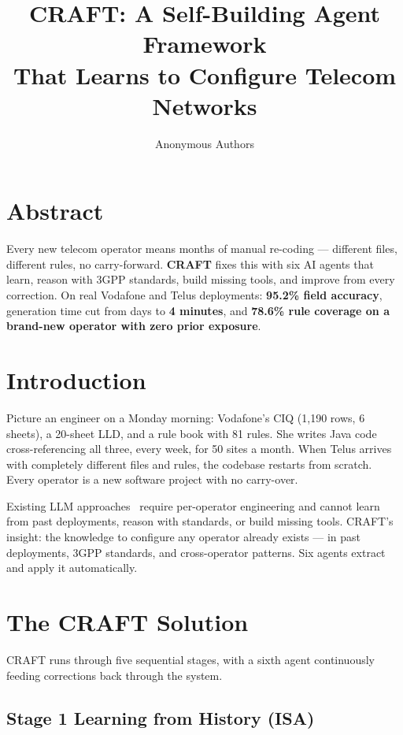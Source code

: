 \documentclass[10.5pt]{article}
\title{\textbf{\Large CRAFT: A Self-Building Agent Framework\\[4pt]
That Learns to Configure Telecom Networks}}
\author{Anonymous Authors}
\date{}
\begin{document}
\maketitle

\section*{Abstract}

Every new telecom operator means months of manual re-coding --- different files, different rules, no carry-forward. \textbf{CRAFT} fixes this with six AI agents that learn, reason with 3GPP standards, build missing tools, and improve from every correction. On real Vodafone and Telus deployments: \textbf{95.2\% field accuracy}, generation time cut from days to \textbf{4 minutes}, and \textbf{78.6\% rule coverage on a brand-new operator with zero prior exposure}.

\section{Introduction}

Picture an engineer on a Monday morning: Vodafone's CIQ (1,190 rows, 6 sheets), a 20-sheet LLD, and a rule book with 81 rules. She writes Java code cross-referencing all three, every week, for 50 sites a month. When Telus arrives with completely different files and rules, the codebase restarts from scratch. Every operator is a new software project with no carry-over.

Existing LLM approaches~\cite{lira2024largelanguagemodelszero, provvedi2026intentllm, wang2026llmpowered} require per-operator engineering and cannot learn from past deployments, reason with standards, or build missing tools. CRAFT's insight: the knowledge to configure any operator already exists --- in past deployments, 3GPP standards, and cross-operator patterns. Six agents extract and apply it automatically.

\section{The CRAFT Solution}

CRAFT runs through five sequential stages, with a sixth agent continuously feeding corrections back through the system.

\subsection*{Stage 1 \quad Learning from History (ISA)}
\end{document}
